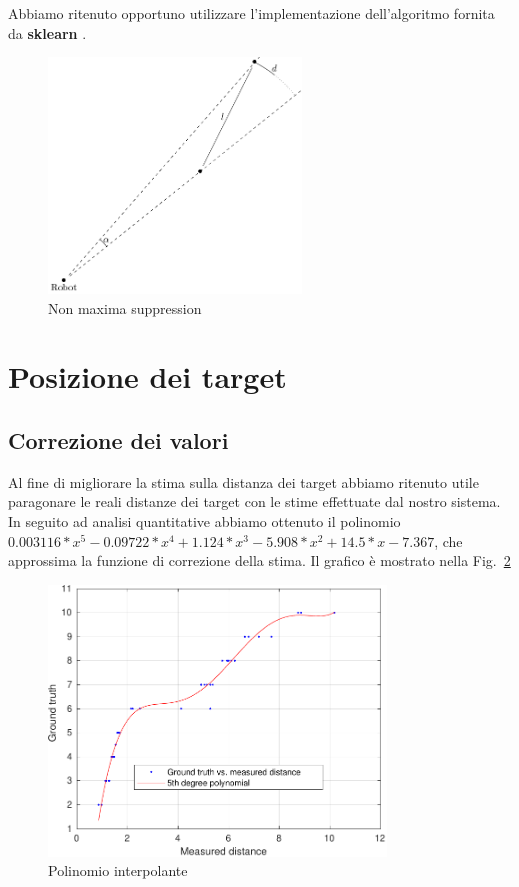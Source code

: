 \documentclass[a4paper]{article}
\begin{document}
	Abbiamo ritenuto opportuno utilizzare l'implementazione dell'algoritmo
	fornita da \textbf{sklearn} \cite{scikit}.
	
	\begin{figure}[H]
		\centering
		\includegraphics[width=0.6\textwidth]{./img/nms.pdf}
		\caption{Non maxima suppression}
		\label{fig:nms}
	\end{figure}
	\section{Posizione dei target}\label{sec:Posizione-dei-target}

	
	\subsection{Correzione dei valori}\label{subsec:Correzione-dei-valori}
	Al fine di migliorare la stima sulla distanza dei target abbiamo ritenuto
	utile paragonare le reali distanze dei target con le stime effettuate dal
	nostro sistema. In seguito ad analisi quantitative abbiamo ottenuto il
	polinomio 	$0.003116*x^5 - 0.09722*x^4 + 1.124*x^3 -5.908*x^2 +
	14.5*x-7.367$,  che approssima la funzione di correzione della stima. Il
	grafico è mostrato nella Fig.~\ref{fig:interpolation}
	
	\begin{figure}[H]
		\centering
		\includegraphics[width=0.8\textwidth]{./img/interpolation.pdf}
		\caption{Polinomio interpolante}
		\label{fig:interpolation}
	\end{figure}
\end{document}
